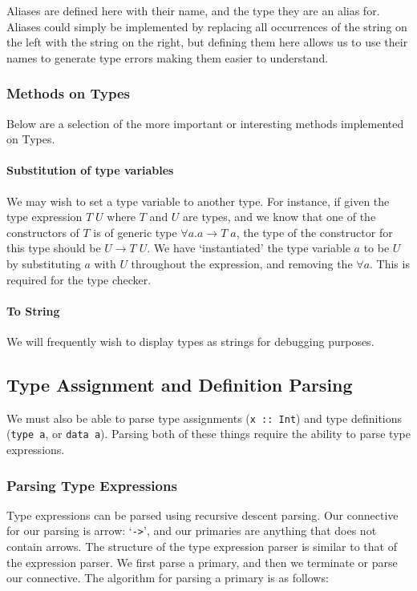 Aliases are defined here with their name, and the type they are an alias for. Aliases could simply be implemented by replacing all occurrences of the string on the left with the string on the right, but defining them here allows us to use their names to generate type errors making them easier to understand. 

\subsubsection{Methods on Types}
Below are a selection of the more important or interesting methods implemented on Types.

\paragraph{Substitution of type variables} We may wish to set a type variable to another type. For instance, if given the type expression \(T \; U\) where \(T\) and \(U\) are types, and we know that one of the constructors of \(T\) is of generic type \(\forall a.a \rightarrow T \; a\), the type of the constructor for this type should be \(U \rightarrow T \; U\). We have `instantiated' the type variable \(a\) to be \(U\) by substituting \(a\) with \(U\) throughout the expression, and removing the \(\forall a\). This is required for the type checker. 

\paragraph{To String} We will frequently wish to display types as strings for debugging purposes. 
\subsection{Type Assignment and Definition Parsing}
We must also be able to parse type assignments (\verb|x :: Int|) and type definitions (\verb|type a|, or \verb|data a|). Parsing both of these things require the ability to parse type expressions. 

\subsubsection{Parsing Type Expressions}
Type expressions can be parsed using recursive descent parsing. Our connective for our parsing is arrow: `\verb|->|', and our primaries are anything that does not contain arrows. The structure of the type expression parser is similar to that of the expression parser. We first parse a primary, and then we terminate or parse our connective. The algorithm for parsing a primary is as follows:

